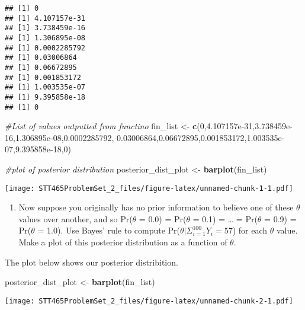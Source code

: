 \documentclass[]{article}
\newenvironment{Shaded}{\begin{snugshade}}{\end{snugshade}}
\newcommand{\KeywordTok}[1]{\textcolor[rgb]{0.13,0.29,0.53}{\textbf{#1}}}
\newcommand{\DecValTok}[1]{\textcolor[rgb]{0.00,0.00,0.81}{#1}}
\newcommand{\FloatTok}[1]{\textcolor[rgb]{0.00,0.00,0.81}{#1}}
\newcommand{\StringTok}[1]{\textcolor[rgb]{0.31,0.60,0.02}{#1}}
\newcommand{\CommentTok}[1]{\textcolor[rgb]{0.56,0.35,0.01}{\textit{#1}}}
\newcommand{\NormalTok}[1]{#1}
\providecommand{\tightlist}{%
  \setlength{\itemsep}{0pt}\setlength{\parskip}{0pt}}
\begin{document}
\begin{verbatim}
## [1] 0
## [1] 4.107157e-31
## [1] 3.738459e-16
## [1] 1.306895e-08
## [1] 0.0002285792
## [1] 0.03006864
## [1] 0.06672895
## [1] 0.001853172
## [1] 1.003535e-07
## [1] 9.395858e-18
## [1] 0
\end{verbatim}

\begin{Shaded}
\begin{Highlighting}[]
\CommentTok{#List of values outputted from functino}
\NormalTok{fin_list <-}\StringTok{ }\KeywordTok{c}\NormalTok{(}\DecValTok{0}\NormalTok{,}\FloatTok{4.107157e-31}\NormalTok{,}\FloatTok{3.738459e-16}\NormalTok{,}\FloatTok{1.306895e-08}\NormalTok{,}\FloatTok{0.0002285792}\NormalTok{,}
              \FloatTok{0.03006864}\NormalTok{,}\FloatTok{0.06672895}\NormalTok{,}\FloatTok{0.001853172}\NormalTok{,}\FloatTok{1.003535e-07}\NormalTok{,}\FloatTok{9.395858e-18}\NormalTok{,}\DecValTok{0}\NormalTok{)}

\CommentTok{#plot of posterior distribution}
\NormalTok{posterior_dist_plot <-}\StringTok{ }\KeywordTok{barplot}\NormalTok{(fin_list)}
\end{Highlighting}
\end{Shaded}

\texttt{[image: STT465ProblemSet\_2\_files/figure-latex/unnamed-chunk-1-1.pdf]}

\begin{enumerate}
\def\labelenumi{\alph{enumi})}
\setcounter{enumi}{2}
\tightlist
\item
  Now suppose you originally has no prior information to believe one of
  these \(\theta\) values over another, and so Pr(\(\theta\) = 0.0) =
  Pr(\(\theta\) = 0.1) = \ldots{} = Pr(\(\theta\) = 0.9) = Pr(\(\theta\)
  = 1.0). Use Bayes' rule to compute
  Pr(\(\theta | \Sigma_{i=1}^{100} Y_i = 57\)) for each \(\theta\)
  value. Make a plot of this posterior distribution as a function of
  \(\theta\).
\end{enumerate}

The plot below shows our posterior distribition.

\begin{Shaded}
\begin{Highlighting}[]
\NormalTok{posterior_dist_plot <-}\StringTok{ }\KeywordTok{barplot}\NormalTok{(fin_list)}
\end{Highlighting}
\end{Shaded}

\texttt{[image: STT465ProblemSet\_2\_files/figure-latex/unnamed-chunk-2-1.pdf]}
\end{document}
